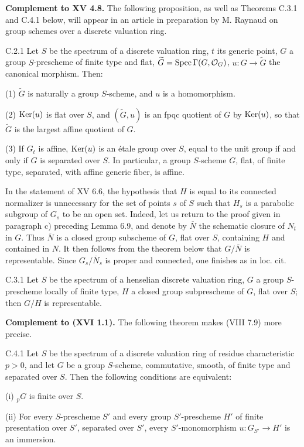 \label{XVII.C.2}\textbf{Complement to XV 4.8.}
The following proposition, as well as Theorems C.3.1 and C.4.1 below, will appear in an article in preparation by M. Raynaud on group schemes over a discrete valuation ring.
\begin{proposition}{C.2.1}\label{XVII.C.2.1}
Let $S$ be the spectrum of a discrete valuation ring, $t$ its generic point, $G$ a group $S$-prescheme of finite type and flat, $\widetilde G=\operatorname{Spec}\Gamma(G,\mathcal{O}_G)$, $u:G\to\widetilde G$ the canonical morphism. Then:

\noindent (1) $\widetilde G$ is naturally a group $S$-scheme, and $u$ is a homomorphism.

\noindent (2) $\operatorname{Ker}(u)$ is flat over $S$, and $(\widetilde G,u)$ is an fpqc quotient of $G$ by $\operatorname{Ker}(u)$, so that $\widetilde G$ is the largest affine quotient of $G$.

\noindent (3) If $G_t$ is affine, $\operatorname{Ker}(u)$ is an étale group over $S$, equal to the unit group if and only if $G$ is separated over $S$. In particular, a group $S$-scheme $G$, flat, of finite type, separated, with affine generic fiber, is affine.
\end{proposition}

\label{XVII.C.3}
In the statement of XV 6.6, the hypothesis that $H$ is equal to its connected normalizer is unnecessary for the set of points $s$ of $S$ such that $H_s$ is a parabolic subgroup of $G_s$ to be an open set. Indeed, let us return to the proof given in paragraph c) preceding Lemma 6.9, and denote by $\overline N$ the schematic closure of $N_t$ in $G$. Thus $\overline N$ is a closed group subscheme of $G$, flat over $S$, containing $H$ and contained in $N$. It then follows from the theorem below that $G/\overline N$ is representable. Since $G_s/\overline N_s$ is proper and connected, one finishes as in loc. cit.
\begin{theorem}{C.3.1}\label{XVII.C.3.1}
Let $S$ be the spectrum of a henselian discrete valuation ring, $G$ a group $S$-prescheme locally of finite type, $H$ a closed group subprescheme of $G$, flat over $S$; then $G/H$ is representable.
\end{theorem}

\label{XVII.C.4}\textbf{Complement to (XVI 1.1).}
The following theorem makes (VIII 7.9) more precise.
\begin{theorem}{C.4.1}\label{XVII.C.4.1}
Let $S$ be the spectrum of a discrete valuation ring of residue characteristic $p>0$, and let $G$ be a group $S$-scheme, commutative, smooth, of finite type and separated over $S$. Then the following conditions are equivalent:

\noindent (i) ${}_pG$ is finite over $S$.

\noindent (ii) For every $S$-prescheme $S'$ and every group $S'$-prescheme $H'$ of finite presentation over $S'$, separated over $S'$, every $S'$-monomorphism $u:G_{S'}\to H'$ is an immersion.
\end{theorem}

